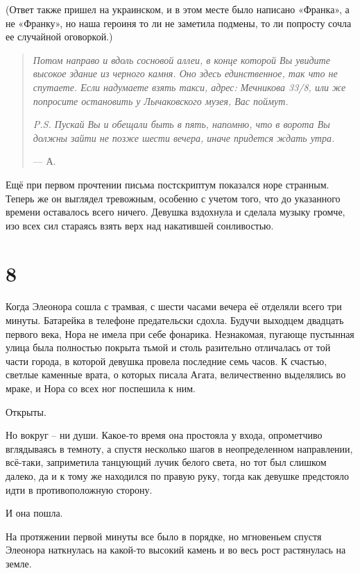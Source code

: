 \documentclass[
  a5paperpaper,
  DIV=11,
  numbers=noendperiod]{scrreprt}
\begin{document}
(Ответ также пришел на украинском, и в этом месте было написано
«Франка», а не «Франку», но наша героиня то ли не заметила подмены, то
ли попросту сочла ее случайной оговоркой.)

\begin{quote}
\emph{Потом направо и вдоль сосновой аллеи, в конце которой Вы увидите
высокое здание из черного камня. Оно здесь единственное, так что не
спутаете. Если надумаете взять такси, адрес: Мечникова 33/8, или же
попросите остановить у Лычаковского музея, Вас поймут.}

\emph{P.S. Пускай Вы и обещали быть в пять, напомню, что в ворота Вы
должны зайти не позже шести вечера, иначе придется ждать утра.}

--- А.
\end{quote}

Ещё при первом прочтении письма постскриптум показался норе странным.
Теперь же он выглядел тревожным, особенно с учетом того, что до
указанного времени оставалось всего ничего. Девушка вздохнула и сделала
музыку громче, изо всех сил стараясь взять верх над накатившей
сонливостью.

\section*{8}\label{8}


Когда Элеонора сошла с трамвая, с шести часами вечера её отделяли всего
три минуты. Батарейка в телефоне предательски сдохла. Будучи выходцем
двадцать первого века, Нора не имела при себе фонарика. Незнакомая,
пугающе пустынная улица была полностью покрыта тьмой и столь разительно
отличалась от той части города, в которой девушка провела последние семь
часов. К счастью, светлые каменные врата, о которых писала Агата,
величественно выделялись во мраке, и Нора со всех ног поспешила к ним.

Открыты.

Но вокруг -- ни души. Какое-то время она простояла у входа, опрометчиво
вглядываясь в темноту, а спустя несколько шагов в неопределенном
направлении, всё-таки, заприметила танцующий лучик белого света, но тот
был слишком далеко, да и к тому же находился по правую руку, тогда как
девушке предстояло идти в противоположную сторону.

И она пошла.

На протяжении первой минуты все было в порядке, но мгновеньем спустя
Элеонора наткнулась на какой-то высокий камень и во весь рост
растянулась на земле.
\end{document}
